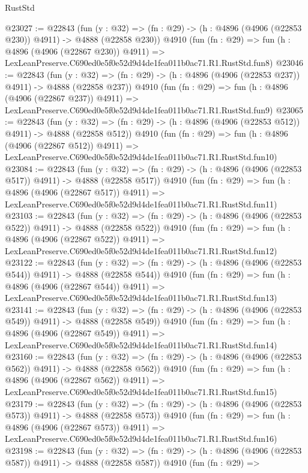 \begin{lexlean}{RustStd}
\begin{coremodule}
@23027 := @22843
    (fun (y : @32) => (fn : @29) -> (h : @4896 (@4906 (@22853 @230)) @4911) -> @4888 (@22858 @230))
    @4910
    (fun (fn : @29) =>
    fun (h : @4896 (@4906 (@22867 @230)) @4911) =>
    LexLeanPreserve.C690ed0e5f0e52d9d4de1fea011b0ac71.R1.RustStd.fun8)
@23046 := @22843
    (fun (y : @32) => (fn : @29) -> (h : @4896 (@4906 (@22853 @237)) @4911) -> @4888 (@22858 @237))
    @4910
    (fun (fn : @29) =>
    fun (h : @4896 (@4906 (@22867 @237)) @4911) =>
    LexLeanPreserve.C690ed0e5f0e52d9d4de1fea011b0ac71.R1.RustStd.fun9)
@23065 := @22843
    (fun (y : @32) => (fn : @29) -> (h : @4896 (@4906 (@22853 @512)) @4911) -> @4888 (@22858 @512))
    @4910
    (fun (fn : @29) =>
    fun (h : @4896 (@4906 (@22867 @512)) @4911) =>
    LexLeanPreserve.C690ed0e5f0e52d9d4de1fea011b0ac71.R1.RustStd.fun10)
@23084 := @22843
    (fun (y : @32) => (fn : @29) -> (h : @4896 (@4906 (@22853 @517)) @4911) -> @4888 (@22858 @517))
    @4910
    (fun (fn : @29) =>
    fun (h : @4896 (@4906 (@22867 @517)) @4911) =>
    LexLeanPreserve.C690ed0e5f0e52d9d4de1fea011b0ac71.R1.RustStd.fun11)
@23103 := @22843
    (fun (y : @32) => (fn : @29) -> (h : @4896 (@4906 (@22853 @522)) @4911) -> @4888 (@22858 @522))
    @4910
    (fun (fn : @29) =>
    fun (h : @4896 (@4906 (@22867 @522)) @4911) =>
    LexLeanPreserve.C690ed0e5f0e52d9d4de1fea011b0ac71.R1.RustStd.fun12)
@23122 := @22843
    (fun (y : @32) => (fn : @29) -> (h : @4896 (@4906 (@22853 @544)) @4911) -> @4888 (@22858 @544))
    @4910
    (fun (fn : @29) =>
    fun (h : @4896 (@4906 (@22867 @544)) @4911) =>
    LexLeanPreserve.C690ed0e5f0e52d9d4de1fea011b0ac71.R1.RustStd.fun13)
@23141 := @22843
    (fun (y : @32) => (fn : @29) -> (h : @4896 (@4906 (@22853 @549)) @4911) -> @4888 (@22858 @549))
    @4910
    (fun (fn : @29) =>
    fun (h : @4896 (@4906 (@22867 @549)) @4911) =>
    LexLeanPreserve.C690ed0e5f0e52d9d4de1fea011b0ac71.R1.RustStd.fun14)
@23160 := @22843
    (fun (y : @32) => (fn : @29) -> (h : @4896 (@4906 (@22853 @562)) @4911) -> @4888 (@22858 @562))
    @4910
    (fun (fn : @29) =>
    fun (h : @4896 (@4906 (@22867 @562)) @4911) =>
    LexLeanPreserve.C690ed0e5f0e52d9d4de1fea011b0ac71.R1.RustStd.fun15)
@23179 := @22843
    (fun (y : @32) => (fn : @29) -> (h : @4896 (@4906 (@22853 @573)) @4911) -> @4888 (@22858 @573))
    @4910
    (fun (fn : @29) =>
    fun (h : @4896 (@4906 (@22867 @573)) @4911) =>
    LexLeanPreserve.C690ed0e5f0e52d9d4de1fea011b0ac71.R1.RustStd.fun16)
@23198 := @22843
    (fun (y : @32) => (fn : @29) -> (h : @4896 (@4906 (@22853 @587)) @4911) -> @4888 (@22858 @587))
    @4910
    (fun (fn : @29) =>

\end{coremodule}
\end{lexlean}
